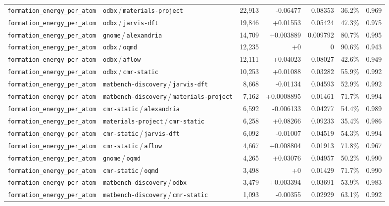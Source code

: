 \begin{longtable}{llrrrrr}
\texttt{formation\_energy\_per\_atom} & \texttt{odbx}\,/\,\texttt{materials-project} & 22{,}913 & -0.06477 & 0.08353 & 36.2\% & 0.969 \\
\texttt{formation\_energy\_per\_atom} & \texttt{odbx}\,/\,\texttt{jarvis-dft} & 19{,}846 & +0.01553 & 0.05424 & 47.3\% & 0.975 \\
\texttt{formation\_energy\_per\_atom} & \texttt{gnome}\,/\,\texttt{alexandria} & 14{,}709 & +0.003889 & 0.009792 & 80.7\% & 0.995 \\
\texttt{formation\_energy\_per\_atom} & \texttt{odbx}\,/\,\texttt{oqmd} & 12{,}235 & +0 & 0 & 90.6\% & 0.943 \\
\texttt{formation\_energy\_per\_atom} & \texttt{odbx}\,/\,\texttt{aflow} & 12{,}111 & +0.04023 & 0.08027 & 42.6\% & 0.949 \\
\texttt{formation\_energy\_per\_atom} & \texttt{odbx}\,/\,\texttt{cmr-static} & 10{,}253 & +0.01088 & 0.03282 & 55.9\% & 0.992 \\
\texttt{formation\_energy\_per\_atom} & \texttt{matbench-discovery}\,/\,\texttt{jarvis-dft} & 8{,}668 & -0.01134 & 0.04593 & 52.9\% & 0.992 \\
\texttt{formation\_energy\_per\_atom} & \texttt{matbench-discovery}\,/\,\texttt{materials-project} & 7{,}162 & +0.0008895 & 0.01461 & 71.7\% & 0.994 \\
\texttt{formation\_energy\_per\_atom} & \texttt{cmr-static}\,/\,\texttt{alexandria} & 6{,}592 & -0.006133 & 0.04277 & 54.4\% & 0.989 \\
\texttt{formation\_energy\_per\_atom} & \texttt{materials-project}\,/\,\texttt{cmr-static} & 6{,}258 & +0.08266 & 0.09233 & 35.4\% & 0.986 \\
\texttt{formation\_energy\_per\_atom} & \texttt{cmr-static}\,/\,\texttt{jarvis-dft} & 6{,}092 & -0.01007 & 0.04519 & 54.3\% & 0.994 \\
\texttt{formation\_energy\_per\_atom} & \texttt{cmr-static}\,/\,\texttt{aflow} & 4{,}667 & +0.008804 & 0.01913 & 71.8\% & 0.967 \\
\texttt{formation\_energy\_per\_atom} & \texttt{gnome}\,/\,\texttt{oqmd} & 4{,}265 & +0.03076 & 0.04957 & 50.2\% & 0.990 \\
\texttt{formation\_energy\_per\_atom} & \texttt{cmr-static}\,/\,\texttt{oqmd} & 3{,}498 & +0 & 0.01429 & 71.7\% & 0.990 \\
\texttt{formation\_energy\_per\_atom} & \texttt{matbench-discovery}\,/\,\texttt{odbx} & 3{,}479 & +0.003394 & 0.03691 & 53.9\% & 0.983 \\
\texttt{formation\_energy\_per\_atom} & \texttt{matbench-discovery}\,/\,\texttt{cmr-static} & 1{,}093 & -0.00355 & 0.02929 & 63.1\% & 0.992 \\

\end{longtable}
